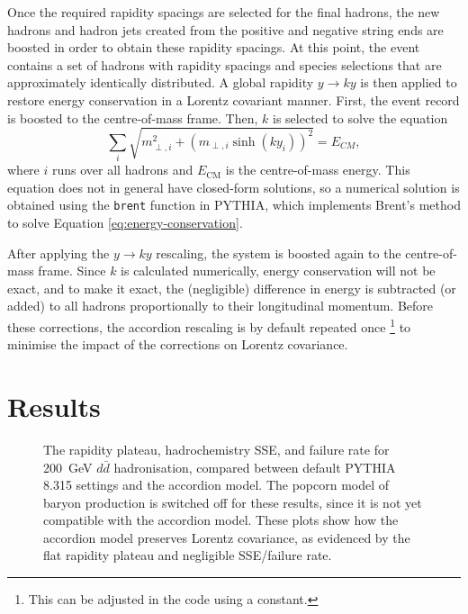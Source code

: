\documentclass[12pt,a4paper]{report}
\begin{document}
Once the required rapidity spacings are selected for the final hadrons, the new hadrons and hadron jets created from the positive and negative string ends are boosted in order to obtain these rapidity spacings. At this point, the event contains a set of hadrons with rapidity spacings and species selections that are approximately identically distributed. A global rapidity $y \rightarrow ky$ is then applied to restore energy conservation in a Lorentz covariant manner. First, the event record is boosted to the centre-of-mass frame. Then, $k$ is selected to solve the equation
\begin{equation} \label{eq:energy-conservation}
  \sum_i \sqrt{m_{\perp,i}^2 + (m_{\perp,i}\sinh(k y_i))^2} = E_{CM},
\end{equation}
where $i$ runs over all hadrons and $E_\text{CM}$ is the centre-of-mass energy. This equation does not in general have closed-form solutions, so a numerical solution is obtained using the \texttt{brent} function in PYTHIA, which implements Brent's method \cite{Brent1973} to solve Equation \eqref{eq:energy-conservation}.

After applying the $y \rightarrow ky$ rescaling, the system is boosted again to the centre-of-mass frame. Since $k$ is calculated numerically, energy conservation will not be exact, and to make it exact, the (negligible) difference in energy is subtracted (or added) to all hadrons proportionally to their longitudinal momentum. Before these corrections, the accordion rescaling is by default repeated once \footnote{This can be adjusted in the code using a constant.} to minimise the impact of the corrections on Lorentz covariance.

\section{Results}
\begin{figure}
  \centering
  
  \caption{The rapidity plateau, hadrochemistry SSE, and failure rate for \qty{200}{\giga\electronvolt} $d\bar{d}$ hadronisation, compared between default PYTHIA 8.315 settings and the accordion model. The popcorn model of baryon production is switched off for these results, since it is not yet compatible with the accordion model. These plots show how the accordion model preserves Lorentz covariance, as evidenced by the flat rapidity plateau and negligible SSE/failure rate.}
  \label{fig:dNdysse-accordion}
\end{figure}
\end{document}
